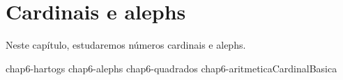 \chapter{Cardinais e alephs}\label{chap:cardinaisEAlephs}

Neste capítulo, estudaremos números cardinais e alephs.

{chap6-hartogs}
{chap6-alephs}
{chap6-quadrados}
{chap6-aritmeticaCardinalBasica}
